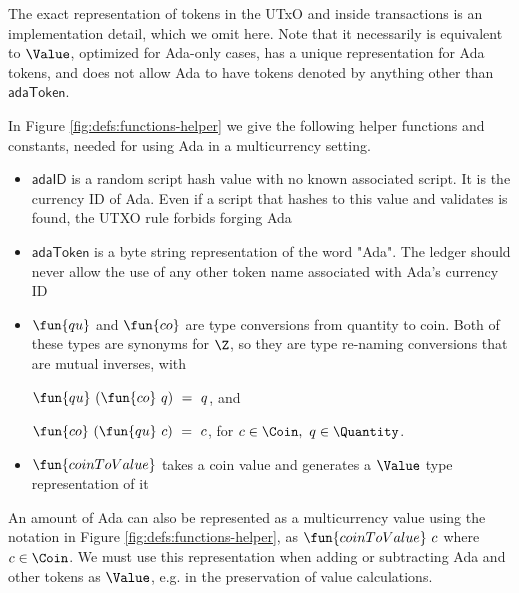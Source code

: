 The exact representation of tokens in the UTxO and inside transactions
is an implementation detail, which we omit here.
Note that it necessarily is equivalent to $\Value$, optimized
for Ada-only cases, has a unique representation for Ada tokens,
and does not allow Ada to have tokens denoted by anything other than $\mathsf{adaToken}$.

In Figure \ref{fig:defs:functions-helper} we give the following helper functions
and constants, needed for using Ada in a multicurrency setting.

\begin{itemize}
  \item $\mathsf{adaID}$ is a random script hash value with no known associated
  script. It is the currency ID of Ada. Even if a
  script that hashes to this value
  and validates is found, the UTXO rule forbids forging Ada
  \item $\mathsf{adaToken}$ is a byte string representation of the word "Ada".
  The ledger should never allow the use of any other token name associated
  with Ada's currency ID
  \item $\fun{qu}$ and $\fun{co}$ are type conversions from quantity to
  coin. Both of these types are synonyms for $\Z$, so they are
  type re-naming conversions that are mutual inverses, with

  $\fun{qu} ~(\fun{co} ~q )~= ~q$, and

  $\fun{co}~ (\fun{qu}~ c) ~=~ c$, for $c \in \Coin,~q \in \Quantity$.

  \item $\fun{coinToValue}$ takes a coin value and generates a $\Value$ type representation
  of it
\end{itemize}

An amount of Ada can also be represented as a multicurrency value
using the notation in Figure \ref{fig:defs:functions-helper}, as
$\fun{coinToValue}~c$ where $c \in \Coin$. We must use this representation
when adding or subtracting Ada and other tokens as $\Value$, e.g. in the
preservation of value calculations.

